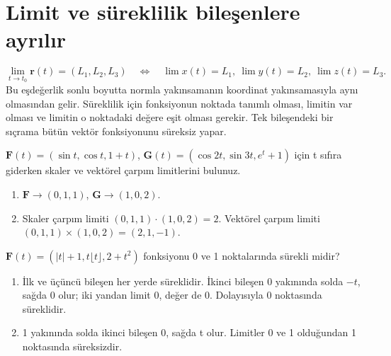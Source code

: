 \section{Limit ve süreklilik bileşenlere ayrılır}

{\small\[
\lim_{t\to t_0}\mathbf r(t)=(L_1,L_2,L_3)\quad\Longleftrightarrow\quad\lim x(t)=L_1,\ \lim y(t)=L_2,\ \lim z(t)=L_3.
\]}
Bu eşdeğerlik sonlu boyutta normla yakınsamanın koordinat yakınsamasıyla aynı olmasından gelir. Süreklilik için fonksiyonun noktada tanımlı olması, limitin var olması ve limitin o noktadaki değere eşit olması gerekir. Tek bileşendeki bir sıçrama bütün vektör fonksiyonunu süreksiz yapar.

\begin{tcolorbox}[title={Örnek 3.3 | Defterdeki limit işlemleri},colframe=accent]\(\mathbf F(t)=(\sin t,\cos t,1+t)\), \(\mathbf G(t)=(\cos2t,\sin3t,e^t+1)\) için t sıfıra giderken skaler ve vektörel çarpım limitlerini bulunuz.
\par{}\end{tcolorbox}
\begin{tcolorbox}[title={Adım adım çözüm},colback=green!3!white,colframe=green]\begin{enumerate}
\item \(\mathbf F\to(0,1,1)\), \(\mathbf G\to(1,0,2)\).
\item Skaler çarpım limiti \((0,1,1)\cdot(1,0,2)=2\). Vektörel çarpım limiti \((0,1,1)\times(1,0,2)=(2,1,-1)\).
\end{enumerate}\end{tcolorbox}
\begin{tcolorbox}[title={Örnek 3.4 | Tam kısım içeren süreklilik},colframe=accent]\(\mathbf F(t)=(|t|+1,t\lfloor t\rfloor,2+t^2)\) fonksiyonu 0 ve 1 noktalarında sürekli midir?
\par{}\end{tcolorbox}
\begin{tcolorbox}[title={Adım adım çözüm},colback=green!3!white,colframe=green]\begin{enumerate}
\item İlk ve üçüncü bileşen her yerde süreklidir. İkinci bileşen 0 yakınında solda \(-t\), sağda 0 olur; iki yandan limit 0, değer de 0. Dolayısıyla 0 noktasında süreklidir.
\item 1 yakınında solda ikinci bileşen 0, sağda t olur. Limitler 0 ve 1 olduğundan 1 noktasında süreksizdir.
\end{enumerate}\end{tcolorbox}
